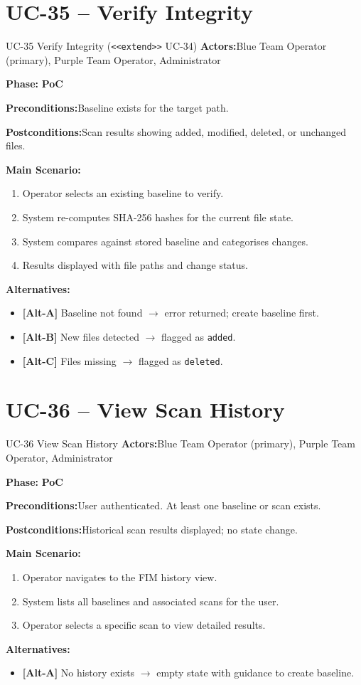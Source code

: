 \documentclass[12pt,a4paper]{report}
\newcommand{\ucfield}[2]{%
    \noindent\textbf{\color{helixpurplemid}#1:}\quad #2\par\medskip
}
\newcommand{\ucphase}[1]{%
    \noindent\textbf{\color{helixpurplemid}Phase:}\quad%
    \ifstrequal{#1}{PoC}{\textcolor{helixteal}{\textbf{PoC}}}{\textcolor{helixamber}{\textbf{Future MVP}}}%
    \par\medskip
}
\begin{document}
\section{UC-35 -- Verify Integrity}
\begin{ucbox}{UC-35 \quad Verify Integrity \textnormal{(\texttt{<<extend>>} UC-34)}}
    \ucfield{Actors}{Blue Team Operator (primary), Purple Team Operator, Administrator}
    \ucphase{PoC}
    \ucfield{Preconditions}{Baseline exists for the target path.}
    \ucfield{Postconditions}{Scan results showing added, modified, deleted, or unchanged files.}
    \textbf{\color{helixpurplemid}Main Scenario:}
    \begin{enumerate}
        \item Operator selects an existing baseline to verify.
        \item System re-computes SHA-256 hashes for the current file state.
        \item System compares against stored baseline and categorises changes.
        \item Results displayed with file paths and change status.
    \end{enumerate}
    \textbf{\color{helixpurplemid}Alternatives:}
    \begin{itemize}
        \item \textbf{[Alt-A]} Baseline not found $\rightarrow$ error returned; create baseline first.
        \item \textbf{[Alt-B]} New files detected $\rightarrow$ flagged as \texttt{added}.
        \item \textbf{[Alt-C]} Files missing $\rightarrow$ flagged as \texttt{deleted}.
    \end{itemize}
\end{ucbox}

\section{UC-36 -- View Scan History}
\begin{ucbox}{UC-36 \quad View Scan History}
    \ucfield{Actors}{Blue Team Operator (primary), Purple Team Operator, Administrator}
    \ucphase{PoC}
    \ucfield{Preconditions}{User authenticated. At least one baseline or scan exists.}
    \ucfield{Postconditions}{Historical scan results displayed; no state change.}
    \textbf{\color{helixpurplemid}Main Scenario:}
    \begin{enumerate}
        \item Operator navigates to the FIM history view.
        \item System lists all baselines and associated scans for the user.
        \item Operator selects a specific scan to view detailed results.
    \end{enumerate}
    \textbf{\color{helixpurplemid}Alternatives:}
    \begin{itemize}
        \item \textbf{[Alt-A]} No history exists $\rightarrow$ empty state with guidance to create baseline.
    \end{itemize}
\end{ucbox}
\end{document}
